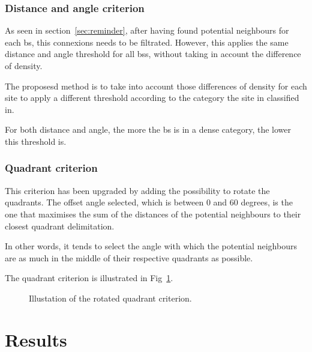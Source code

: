 \documentclass[lettersize,journal,english]{IEEEtran}
\begin{document}
        \subsubsection{Distance and angle criterion}
            As seen in section~\ref{sec:reminder}, after having found potential neighbours for each \acrshort{bs}, this connexions needs to be filtrated. However, this applies the same distance and angle threshold for all \acrshort{bs}s, without taking in account the difference of density.

            The proposesd method is to take into account those differences of density for each site to apply a different threshold according to the category the site in classified in.

            For both distance and angle, the more the \acrshort{bs} is in a dense category, the lower this threshold is.

        \subsubsection{Quadrant criterion}
            This criterion has been upgraded by adding the possibility to rotate the quadrants. The offset angle selected, which is between $0$ and $60$ degrees, is the one that maximises the sum of the distances of the potential neighbours to their closest quadrant delimitation.

            In other words, it tends to select the angle with which the potential neighbours are as much in the middle of their respective quadrants as possible.

            The quadrant criterion is illustrated in Fig~\ref{fig:crit_qua}.
            \begin{figure}
                \centering
                \caption{Illustation of the rotated quadrant criterion.}
                \label{fig:crit_qua}
            \end{figure}

\section{Results\label{sec:res}}
\end{document}
